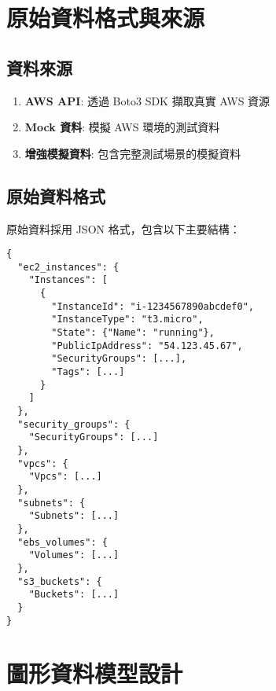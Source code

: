 \documentclass[11pt,a4paper]{ctexart}
\begin{document}
\section{原始資料格式與來源}
\subsection{資料來源}
\begin{enumerate}[leftmargin=1.5em]
    \item \textbf{AWS API}: 透過 Boto3 SDK 擷取真實 AWS 資源
    \item \textbf{Mock 資料}: 模擬 AWS 環境的測試資料
    \item \textbf{增強模擬資料}: 包含完整測試場景的模擬資料
\end{enumerate}

\subsection{原始資料格式}
原始資料採用 JSON 格式，包含以下主要結構：

\begin{verbatim}
{
  "ec2_instances": {
    "Instances": [
      {
        "InstanceId": "i-1234567890abcdef0",
        "InstanceType": "t3.micro",
        "State": {"Name": "running"},
        "PublicIpAddress": "54.123.45.67",
        "SecurityGroups": [...],
        "Tags": [...]
      }
    ]
  },
  "security_groups": {
    "SecurityGroups": [...]
  },
  "vpcs": {
    "Vpcs": [...]
  },
  "subnets": {
    "Subnets": [...]
  },
  "ebs_volumes": {
    "Volumes": [...]
  },
  "s3_buckets": {
    "Buckets": [...]
  }
}
\end{verbatim}

\section{圖形資料模型設計}
\end{document}
